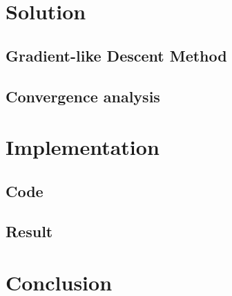 \documentclass[11pt]{article}
\begin{document}
\section{Solution}

\subsection{Gradient-like Descent Method}

\subsection{Convergence analysis}

\section{Implementation}

\subsection{Code}

\subsection{Result}

\section{Conclusion}




\end{document}
